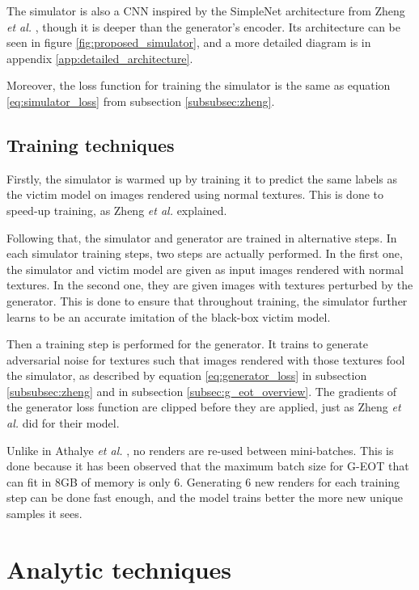 The simulator is also a CNN inspired by the SimpleNet architecture from Zheng \textit{et al.} \cite{zheng_black_box_GAN}, though it is deeper than the generator's encoder. Its architecture can be seen in figure \ref{fig:proposed_simulator}, and a more detailed diagram is in appendix \ref{app:detailed_architecture}.

Moreover, the loss function for training the simulator is the same as equation \ref{eq:simulator_loss} from subsection \ref{subsubsec:zheng}. 

\subsection{Training techniques}

Firstly, the simulator is warmed up by training it to predict the same labels as the victim model on images rendered using normal textures. This is done to speed-up training, as Zheng \textit{et al.} explained.

Following that, the simulator and generator are trained in alternative steps. In each simulator training steps, two steps are actually performed. In the first one, the simulator and victim model are given as input images rendered with normal textures. In the second one, they are given images with textures perturbed by the generator. This is done to ensure that throughout training, the simulator further learns to be an accurate imitation of the black-box victim model.

Then a training step is performed for the generator. It trains to generate adversarial noise for textures such that images rendered with those textures fool the simulator, as described by equation \ref{eq:generator_loss} in subsection \ref{subsubsec:zheng} and in subsection \ref{subsec:g_eot_overview}. The gradients of the generator loss function are clipped before they are applied, just as Zheng \textit{et al.} \cite{zheng_black_box_GAN} did for their model.

Unlike in Athalye \textit{et al.} \cite{athalye}, no renders are re-used between mini-batches. This is done because it has been observed that the maximum batch size for G-EOT that can fit in 8GB of memory is only 6. Generating 6 new renders for each training step can be done fast enough, and the model trains better the more new unique samples it sees.

\section{Analytic techniques}
    \label{sec:analytic_techniques}
    
